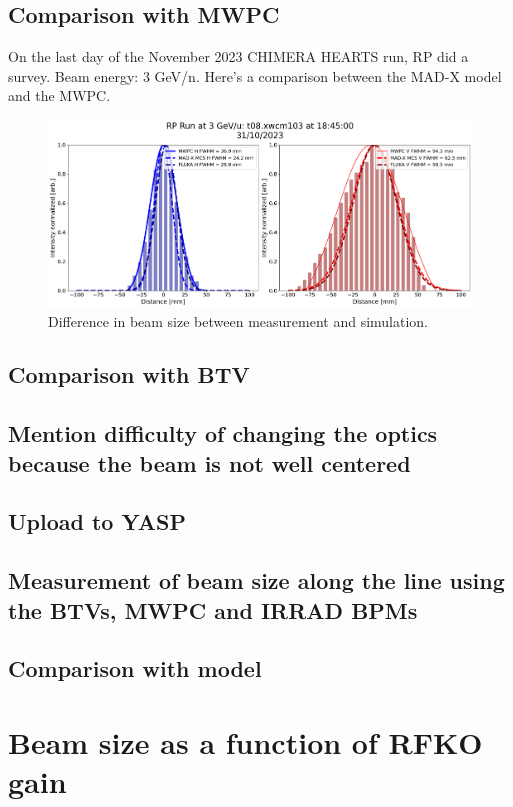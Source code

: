 \documentclass[a4paper,
               biblatex,     %
               ]{jacow}
\begin{document}
\subsection{Comparison with MWPC}

On the last day of the November 2023 CHIMERA HEARTS run, RP did a survey.
Beam energy: 3 GeV/n. Here's a comparison between the MAD-X model and the MWPC.

\begin{figure}[!htb]
   \centering
   \includegraphics*[width=1.0\columnwidth]{rp_survey.png}
   \caption{Difference in beam size between measurement and simulation.}
   \label{fig:diff_beam_size}
\end{figure}

\subsection{Comparison with BTV}
\subsection{Mention difficulty of changing the optics because the beam is not well centered}
\subsection{Upload to YASP}
\subsection{Measurement of beam size along the line using the BTVs, MWPC and IRRAD BPMs}
\subsection{Comparison with model}

\section{Beam size as a function of RFKO gain}
\end{document}
